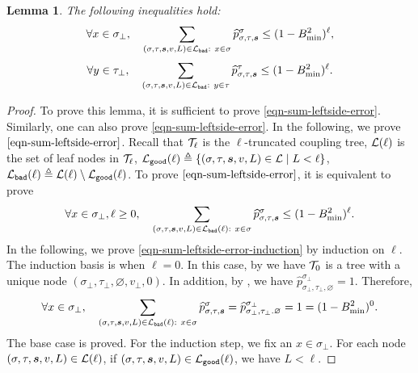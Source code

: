 \documentclass[11pt]{article}
\newtheorem{lemma}[theorem]{Lemma}
\newcommand{\set}[1]{\left\{#1\right\}}
\renewcommand{\mid}{\;\middle\vert\;} \newcommand{\cmid}{\,:\,}
\def\!#1{\mathtt{#1}}
\newcommand{\seqS}{\boldsymbol{s}}
\begin{document}
\begin{lemma} \label{lem:ratio-truncated-error}
The following inequalities hold:
    \begin{align}\label{eqn-sum-leftside-error}
        \forall x\in \sigma_\bot, \quad \sum_{(\sigma,\tau, \seqS,v,L)\in \+L_{\!{bad}}: \ x\in \sigma} \widehat{p}^{\sigma}_{\sigma,\tau,\seqS}\leq (1 - B_{\min}^2)^{\ell},
    \end{align}
    \begin{align}\label{eqn-sum-rightside-error}
        \forall y\in \tau_\bot, \quad \sum_{(\sigma,\tau, \seqS,v,L)\in \+L_{\!{bad}}: \ y\in \tau} \widehat{p}^{\tau}_{\sigma,\tau, \seqS}\leq (1 - B_{\min}^2)^{\ell}.
    \end{align}
\end{lemma}
\begin{proof}
To prove this lemma, it is sufficient to prove \eqref{eqn-sum-leftside-error}.
Similarly, one can also prove \eqref{eqn-sum-leftside-error}.
In the following, we prove $\eqref{eqn-sum-leftside-error}$.
Recall that $\mathcal{T}_{\ell}$ is the $\ell$-truncated coupling tree, $\mathcal{L}(\ell)$ is the set of leaf nodes in $\mathcal{T}_{\ell}$, 
$\+L_{\!{good}}(\ell)\triangleq \set{(\sigma,\tau, \seqS,v,L) \in \+L\mid L<\ell}$, $\+L_{\!{bad}}(\ell)\triangleq \+L(\ell)\setminus \+L_{\!{good}}(\ell)$.
To prove $\eqref{eqn-sum-leftside-error}$,
it is equivalent to prove
\begin{align}\label{eqn-sum-leftside-error-induction}
    \forall x\in \sigma_\bot, \ell\geq 0, \quad \sum_{(\sigma,\tau, \seqS,v,L)\in \+L_{\!{bad}}(\ell): \ x\in \sigma} \widehat{p}^{\sigma}_{\sigma,\tau,\seqS} \leq (1 - B_{\min}^2)^{\ell}.
\end{align}
In the following, we prove \eqref{eqn-sum-leftside-error-induction} by induction on $\ell$.
The induction basis is when $\ell = 0$.
In this case, by  we have $\mathcal{T}_{0}$ is a tree with a unique node $(\sigma_\bot, \tau_\bot, \varnothing, v_\bot, 0)$.
In addition, by , we have 
$\widehat{p}^{\sigma_\bot}_{\sigma_\bot,\tau_\bot, \varnothing} = 1$.
Therefore, 
 \begin{align*}
    \forall x\in \sigma_\bot, \quad \sum_{(\sigma,\tau, \seqS,v,L)\in \+L_{\!{bad}}(\ell): \ x\in \sigma} \widehat{p}^{\sigma}_{\sigma,\tau,\seqS}=\widehat{p}^{\sigma_\bot}_{\sigma_\bot,\tau_\bot. \varnothing} = 1 = (1- B_{\min}^2)^{0}.
\end{align*}
The base case is proved. For the induction step, we fix an $x\in \sigma_\bot$. For each node $(\sigma,\tau,\seqS,v,L)\in \+L(\ell)$, if $(\sigma,\tau,\seqS,v,L) \in \+L_{\!{good}}(\ell)$, we have $L<\ell$.

\end{proof}
\end{document}
